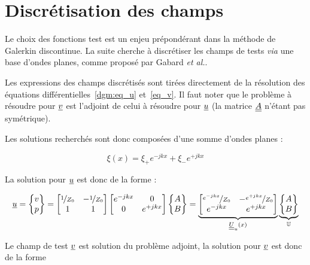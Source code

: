 \section{Discrétisation des champs}

Le choix des fonctions test est un enjeu prépondérant dans la méthode de Galerkin discontinue.
La suite cherche à discrétiser les champs de tests \textit{via} une base d'ondes planes, comme proposé par Gabard
\textit{et al.}\cite{Gabard15}.

Les expressions des champs discrétisés sont tirées directement de la résolution des équations
différentielles~\eqref{dgm:eq_u} et~\eqref{eq_v}. Il faut noter que le problème à résoudre pour $\underline{v}$ est l'adjoint
de celui à résoudre pour $\underline{u}$ (la matrice $\underline{\underline{A}}$ n'étant pas symétrique).

Les solutions recherchés sont donc composées d'une somme d'ondes planes :

\[
    \xi(x) = \xi_+e^{-jkx}+\xi_-e^{+jkx}
\]

La solution pour $\underline{u}$ est donc de la forme :

\begin{equation}
    \underline{u} = \begin{Bmatrix}v\\p\end{Bmatrix} =
    \begin{bmatrix}
        \nicefrac{1}{Z_0} & -\nicefrac{1}{Z_0}\\
        1 & 1
    \end{bmatrix}
    \begin{bmatrix}
        e^{-jkx} & 0\\
        0 & e^{+jkx}
    \end{bmatrix}
    \begin{Bmatrix}
        A\\B
    \end{Bmatrix}
    =
    \underbrace{\begin{bmatrix}
        \nicefrac{e^{-jkx}}{Z_0} & -\nicefrac{e^{+jkx}}{Z_0}\\
        e^{-jkx} & e^{+jkx}
    \end{bmatrix}}_{\underline{\underline{U}}_u(x)}
    \underbrace{\begin{Bmatrix}
        A\\B
    \end{Bmatrix}}_{\mathbb{U}}
\end{equation}

Le champ de test $\underline{v}$ est solution du problème adjoint, la solution pour $\underline{v}$ est donc de la forme

